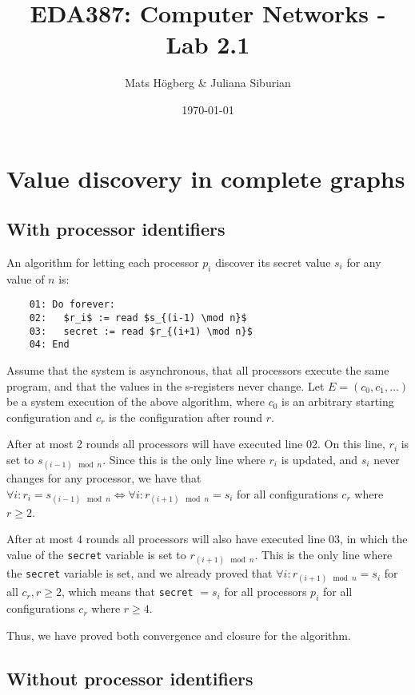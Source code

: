 \documentclass{article}
\title{EDA387: Computer Networks - Lab 2.1}
\author{Mats Högberg \& Juliana Siburian}
\date{\today}
\begin{document}
\maketitle

\section*{Value discovery in complete graphs}

\subsection*{With processor identifiers}

An algorithm for letting each processor $p_i$ discover its secret value $s_i$ for any value of $n$ is:

\begin{lstlisting}
    01: Do forever:
    02:   $r_i$ := read $s_{(i-1) \mod n}$
    03:   secret := read $r_{(i+1) \mod n}$
    04: End
\end{lstlisting}

Assume that the system is asynchronous, that all processors execute the same program, and that the values in the s-registers never change. Let $E = (c_0, c_1, \ldots)$ be a system execution of the above algorithm, where $c_0$ is an arbitrary starting configuration and $c_r$ is the configuration after round $r$.

After at most 2 rounds all processors will have executed line 02. On this line, $r_i$ is set to $s_{(i-1) \mod n}$. Since this is the only line where $r_i$ is updated, and $s_i$ never changes for any processor, we have that $\forall i : r_i = s_{(i-1) \mod n} \Leftrightarrow \forall i : r_{(i+1) \mod n} = s_i$ for all configurations $c_r$ where $r \geq 2$.

After at most 4 rounds all processors will also have executed line 03, in which the value of the \verb|secret| variable is set to $r_{(i+1) \mod n}$. This is the only line where the \verb|secret| variable is set, and we already proved that $\forall i : r_{(i+1) \mod n} = s_i$ for all $c_r, r \ge 2$, which means that \verb|secret| $= s_i$ for all processors $p_i$ for all configurations $c_r$ where $r \geq 4$.

Thus, we have proved both convergence and closure for the algorithm.

\subsection*{Without processor identifiers}
\end{document}

